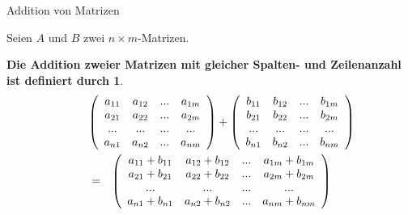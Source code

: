 \documentclass[german]{beamer}
\newcommand{\bq}{\begin{eqnarray*}}
\newcommand{\eq}{\end{eqnarray*}}
\newtheorem*{mytheorem13}{Die Addition zweier Matrizen mit gleicher Spalten- und Zeilenanzahl ist definiert durch}
\begin{document}
\begin{frame}{Addition von Matrizen}

Seien $A$ und $B$ zwei $n \times m$-Matrizen.

\begin{mytheorem13}
{\scriptsize
\bq
\lefteqn{
\left( \begin{array}{cccc}
 a_{11} & a_{12} & ... & a_{1m} \\
 a_{21} & a_{22} & ... & a_{2m} \\
 ...    & ...    & ... & ...    \\
 a_{n1} & a_{n2} & ... & a_{nm} \\
\end{array} \right)
 +
\left( \begin{array}{cccc}
 b_{11} & b_{12} & ... & b_{1m} \\
 b_{21} & b_{22} & ... & b_{2m} \\
 ...    & ...    & ... & ...    \\
 b_{n1} & b_{n2} & ... & b_{nm} \\
\end{array} \right)
 } & &
 \nonumber \\ 
 & = &
\left( \begin{array}{cccc}
 a_{11} + b_{11} & a_{12} + b_{12} & ... & a_{1m} + b_{1m} \\
 a_{21} + b_{21} & a_{22} + b_{22} & ... & a_{2m} + b_{2m} \\
 ...    & ...    & ... & ...    \\
 a_{n1} + b_{n1} & a_{n2} + b_{n2} & ... & a_{nm} + b_{nm} \\
\end{array} \right)
\eq
}
\end{mytheorem13}

\end{frame}
\end{document}
